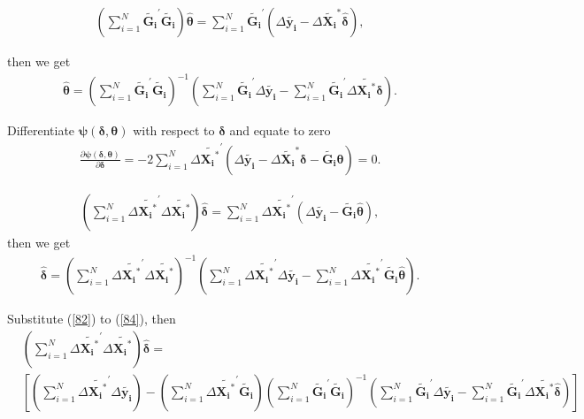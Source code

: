 \documentclass[12pt,a4paper,hyperref]{article}
\begin{document}
\begin{align}
(\sum_{i=1}^{N} \boldsymbol{\tilde{G_{i}}}^{'}\boldsymbol{\tilde{G_{i}}})\hat{\boldsymbol {\theta}} =\sum_{i=1}^{N} \boldsymbol{\tilde{G_{i}}}^{'}(\Delta \boldsymbol {\tilde{\boldsymbol{y_{i}}}} - \Delta \tilde{\boldsymbol{X_{i}}}^{\ast} \hat{\boldsymbol {\delta}}),
\end{align}

then we get
\begin{align}
\hat{\boldsymbol{\theta}}=
(\sum_{i=1}^{N} \tilde{\boldsymbol{G_{i}}}^{'} \tilde{\boldsymbol{G_{i}}})^{-1}(\sum_{i=1}^{N} \tilde{\boldsymbol{G_{i}}}^{'} \Delta \tilde{\boldsymbol{y_{i}}}-  \sum_{i=1}^{N} \tilde{\boldsymbol{G_{i}}}^{'} \Delta \tilde{\boldsymbol{X_{i}}^{\ast}} \hat{\boldsymbol{\delta}}). \label{82}
\end{align}

Differentiate $\boldsymbol {\psi} (\boldsymbol {\delta} , \boldsymbol {\theta})$ with respect to $\boldsymbol{\delta}$ and equate to zero
\begin{align}
\frac{\partial \boldsymbol {\psi} (\boldsymbol {\delta} , \boldsymbol {\theta})}{\partial \boldsymbol{\delta}} = -2\sum_{i=1}^{N} \Delta \tilde{\boldsymbol{X_{i}}^{\ast}}^{'} (\Delta \tilde{\boldsymbol{y_{i}}} - \Delta \tilde{\boldsymbol{X_{i}}}^{\ast} \boldsymbol{\delta} -\tilde{\boldsymbol{G_{i}}} \boldsymbol{\theta}) =0.
\end{align}

\begin{align}
(\sum_{i=1}^{N} \Delta \tilde{\boldsymbol{X_{i}}^{\ast}}^{'} \Delta \tilde{\boldsymbol{X_{i}}^{\ast}}) \hat{\boldsymbol{\delta}} = \sum_{i=1}^{N} \Delta \tilde{\boldsymbol{X_{i}}^{\ast }}^{'}( \Delta \tilde{\boldsymbol{y_{i}}} - \tilde{\boldsymbol{G_{i}}} \hat{\boldsymbol{\theta}} ), \label{84}
\end{align}
then we get
\begin{align}
\hat{\boldsymbol{\delta}} =  (\sum_{i=1}^{N} \Delta \tilde{\boldsymbol{X_{i}}^{\ast}}^{'} \Delta \tilde{\boldsymbol{X_{i}}^{\ast}})^{-1}
(\sum_{i=1}^{N} \Delta \tilde{\boldsymbol{X_{i}}^{\ast}}^{'} \Delta \tilde{\boldsymbol{y_{i}}} - \sum_{i=1}^{N} \Delta \tilde{\boldsymbol{X_{i}}^{\ast}}^{'} \tilde{\boldsymbol{G_{i}}} \hat{\boldsymbol{\theta}} ). \label{85}
\end{align}


Substitute (\ref{82}) to (\ref{84}), then
\begin{equation}
\begin{split}
&(\sum_{i=1}^{N} \Delta \tilde{\boldsymbol{X_{i}}^{\ast}}^{'} \Delta \tilde{\boldsymbol{X_{i}}^{\ast}}) \hat{\boldsymbol{\delta}}= \\
&[(\sum_{i=1}^{N} \Delta \tilde{\boldsymbol{X_{i}}^{\ast}}^{'} \Delta \tilde{\boldsymbol{y_{i}}})-(\sum_{i=1}^{N} \Delta \tilde{\boldsymbol{X_{i}}^{\ast}}^{'} \tilde{\boldsymbol{G_{i}}}) (\sum_{i=1}^{N} \tilde{\boldsymbol{G_{i}}}^{'} \tilde{\boldsymbol{G_{i}}})^{-1}(\sum_{i=1}^{N} \tilde{\boldsymbol{G_{i}}}^{'} \Delta \tilde{\boldsymbol{y_{i}}}-  \sum_{i=1}^{N} \tilde{\boldsymbol{G_{i}}}^{'} \Delta \tilde{\boldsymbol{X_{i}}^{\ast}} \hat{\boldsymbol{\delta}}) ]
\end{split}
\end{equation}
\end{document}
